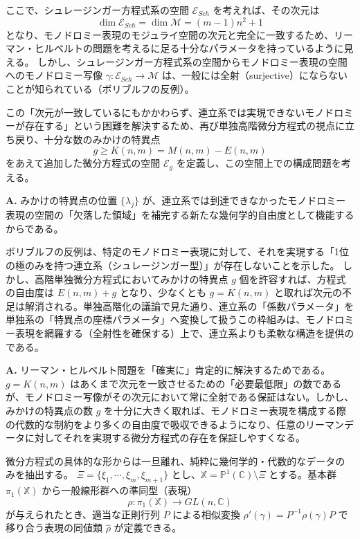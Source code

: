 ここで、シュレージンガー方程式系の空間 $\mathcal{E}_{Sch}$ を考えれば、その次元は
\[
\dim \mathcal{E}_{Sch} = \dim \mathcal{M} = (m-1)n^{2}+1
\]
となり、モノドロミー表現のモジュライ空間の次元と完全に一致するため、リーマン・ヒルベルトの問題を考えるに足る十分なパラメータを持っているように見える。
しかし、シュレージンガー方程式系の空間からモノドロミー表現の空間へのモノドロミー写像 $\gamma : \mathcal{E}_{Sch} \to \mathcal{M}$ は、一般には全射（surjective）にならないことが知られている（ボリブルフの反例）。

この「次元が一致しているにもかかわらず、連立系では実現できないモノドロミーが存在する」という困難を解決するため、再び単独高階微分方程式の視点に立ち戻り、十分な数のみかけの特異点
\[
g \ge K(n,m) = M(n,m) - E(n,m)
\]
をあえて追加した微分方程式の空間 $\mathcal{E}_g$ を定義し、この空間上での構成問題を考える。

\begin{Q}
\textbf{A.} みかけの特異点の位置 $\{\lambda_j\}$ が、連立系では到達できなかったモノドロミー表現の空間の「欠落した領域」を補完する新たな幾何学的自由度として機能するからである。

ボリブルフの反例は、特定のモノドロミー表現に対して、それを実現する「1位の極のみを持つ連立系（シュレージンガー型）」が存在しないことを示した。
しかし、高階単独微分方程式においてみかけの特異点 $g$ 個を許容すれば、方程式の自由度は $E(n,m) + g$ となり、少なくとも $g = K(n,m)$ と取れば次元の不足は解消される。単独高階化の議論で見た通り、連立系の「係数パラメータ」を単独系の「特異点の座標パラメータ」へ変換して扱うこの枠組みは、モノドロミー表現を網羅する（全射性を確保する）上で、連立系よりも柔軟な構造を提供のである。
\end{Q}

\begin{Q}
\textbf{A.} リーマン・ヒルベルト問題を「確実に」肯定的に解決するためである。
$g = K(n,m)$ はあくまで次元を一致させるための「必要最低限」の数であるが、モノドロミー写像がその次元において常に全射である保証はない。しかし、みかけの特異点の数 $g$ を十分に大きく取れば、モノドロミー表現を構成する際の代数的な制約をより多くの自由度で吸収できるようになり、任意のリーマンデータに対してそれを実現する微分方程式の存在を保証しやすくなる。
\end{Q}
微分方程式の具体的な形からは一旦離れ、純粋に幾何学的・代数的なデータのみを抽出する。
$\Xi=\{\xi_{1},\cdots,\xi_{m},\xi_{m+1}\}$ とし、$\mathbb{X}=\mathbb{P}^{1}(\mathbb{C})\setminus \Xi$ とする。基本群 $\pi_1(\mathbb{X})$ から一般線形群への準同型（表現）
\[
\rho:\pi_{1}(\mathbb{X})\to GL(n,\mathbb{C})
\]
が与えられたとき、適当な正則行列 $P$ による相似変換 $\rho'(\gamma) = P^{-1}\rho(\gamma)P$ で移り合う表現の同値類 $\hat{\rho}$ が定義できる。

